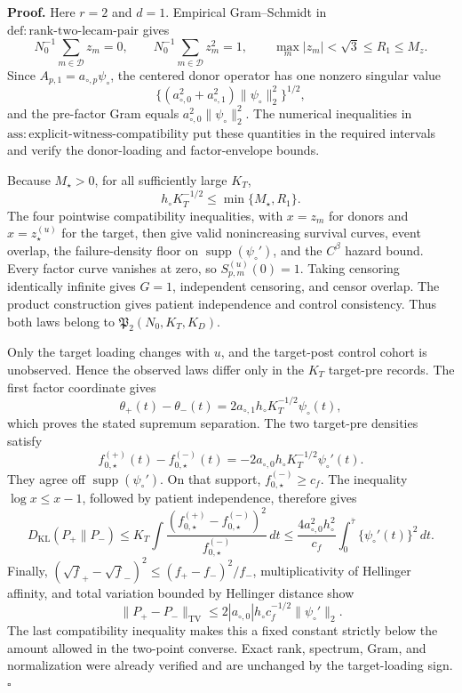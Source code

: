 \textbf{Proof.}
Here \(r=2\) and \(d=1\). Empirical Gram--Schmidt in \(\mathrm{def:rank\mbox{-}two\mbox{-}lecam\mbox{-}pair}\) gives
\[
 N_0^{-1}\sum_{m\in\mathcal D}z_m=0,
 \qquad
 N_0^{-1}\sum_{m\in\mathcal D}z_m^2=1,
 \qquad
 \max_m|z_m|<\sqrt3\le R_1\le M_z.
\]
Since \(A_{p,1}=a_{\circ,p}\psi_\circ\), the centered donor operator has one nonzero singular value
\[
 \{(a_{\circ,0}^2+a_{\circ,1}^2)\|\psi_\circ\|_2^2\}^{1/2},
\]
and the pre-factor Gram equals \(a_{\circ,0}^2\|\psi_\circ\|_2^2\). The numerical inequalities in \(\mathrm{ass:explicit\mbox{-}witness\mbox{-}compatibility}\) put these quantities in the required intervals and verify the donor-loading and factor-envelope bounds.

Because \(M_\star>0\), for all sufficiently large \(K_T\),
\[
 h_\circ K_T^{-1/2}\le\min\{M_\star,R_1\}.
\]
The four pointwise compatibility inequalities, with \(x=z_m\) for donors and \(x=z_\star^{(u)}\) for the target, then give valid nonincreasing survival curves, event overlap, the failure-density floor on \(\operatorname{supp}(\psi_\circ')\), and the \(C^\beta\) hazard bound. Every factor curve vanishes at zero, so \(S_{p,m}^{(u)}(0)=1\). Taking censoring identically infinite gives \(G=1\), independent censoring, and censor overlap. The product construction gives patient independence and control consistency. Thus both laws belong to \(\mathfrak P_2(N_0,K_T,K_D)\).

Only the target loading changes with \(u\), and the target-post control cohort is unobserved. Hence the observed laws differ only in the \(K_T\) target-pre records. The first factor coordinate gives
\[
 \theta_+(t)-\theta_-(t)
 =2a_{\circ,1}h_\circ K_T^{-1/2}\psi_\circ(t),
\]
which proves the stated supremum separation. The two target-pre densities satisfy
\[
 f_{0,\star}^{(+)}(t)-f_{0,\star}^{(-)}(t)
 =-2a_{\circ,0}h_\circ K_T^{-1/2}\psi_\circ'(t).
\]
They agree off \(\operatorname{supp}(\psi_\circ')\). On that support, \(f_{0,\star}^{(-)}\ge c_f\). The inequality \(\log x\le x-1\), followed by patient independence, therefore gives
\[
 D_{\mathrm{KL}}(P_+\|P_-)
 \le K_T\int\frac{(f_{0,\star}^{(+)}-f_{0,\star}^{(-)})^2}{f_{0,\star}^{(-)}}\,dt
 \le\frac{4a_{\circ,0}^2h_\circ^2}{c_f}
 \int_0^{\bar\tau}\{\psi_\circ'(t)\}^2\,dt.
\]
Finally, \((\sqrt f_+-\sqrt f_-)^2\le(f_+-f_-)^2/f_-\), multiplicativity of Hellinger affinity, and total variation bounded by Hellinger distance show
\[
 \|P_+-P_-\|_{\mathrm{TV}}
 \le2|a_{\circ,0}|h_\circ c_f^{-1/2}\|\psi_\circ'\|_2.
\]
The last compatibility inequality makes this a fixed constant strictly below the amount allowed in the two-point converse. Exact rank, spectrum, Gram, and normalization were already verified and are unchanged by the target-loading sign. \(\square\)